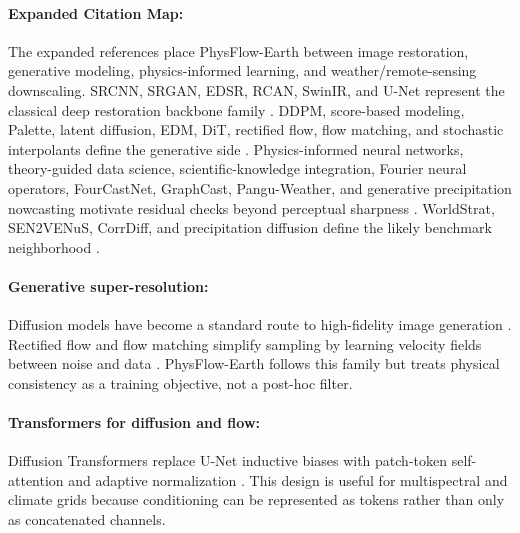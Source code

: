 \documentclass{article}
\begin{document}
\paragraph{Expanded Citation Map:}
The expanded references place PhysFlow-Earth between image restoration, generative modeling, physics-informed learning, and weather/remote-sensing downscaling. SRCNN, SRGAN, EDSR, RCAN, SwinIR, and U-Net represent the classical deep restoration backbone family \citep{dong2016srcnn,ledig2017srgan,lim2017edsr,zhang2018rcan,liang2021swinir,ronneberger2015unet}. DDPM, score-based modeling, Palette, latent diffusion, EDM, DiT, rectified flow, flow matching, and stochastic interpolants define the generative side \citep{ho2020denoising,song2021score,saharia2022image,rombach2022latent,karras2022edm,peebles2023scalable,liu2022rectified,lipman2023flow,albergo2023stochastic}. Physics-informed neural networks, theory-guided data science, scientific-knowledge integration, Fourier neural operators, FourCastNet, GraphCast, Pangu-Weather, and generative precipitation nowcasting motivate residual checks beyond perceptual sharpness \citep{raissi2019physics,karpatne2017theory,karniadakis2021physicsinformed,willard2022integrating,li2021fourier,pathak2022fourcastnet,lam2023graphcast,bi2023panguweather,ravuri2021skillful}. WorldStrat, SEN2VENuS, CorrDiff, and precipitation diffusion define the likely benchmark neighborhood \citep{cornebise2022worldstrat,michel2022sen2venus,mardani2023corrdiff,leinonen2023precipitation}.


\paragraph{Generative super-resolution:}
Diffusion models have become a standard route to high-fidelity image generation \citep{ho2020denoising,song2021score,saharia2022image}. Rectified flow and flow matching simplify sampling by learning velocity fields between noise and data \citep{liu2022rectified,lipman2023flow}. PhysFlow-Earth follows this family but treats physical consistency as a training objective, not a post-hoc filter.

\paragraph{Transformers for diffusion and flow:}
Diffusion Transformers replace U-Net inductive biases with patch-token self-attention and adaptive normalization \citep{peebles2023scalable}. This design is useful for multispectral and climate grids because conditioning can be represented as tokens rather than only as concatenated channels.
\end{document}
